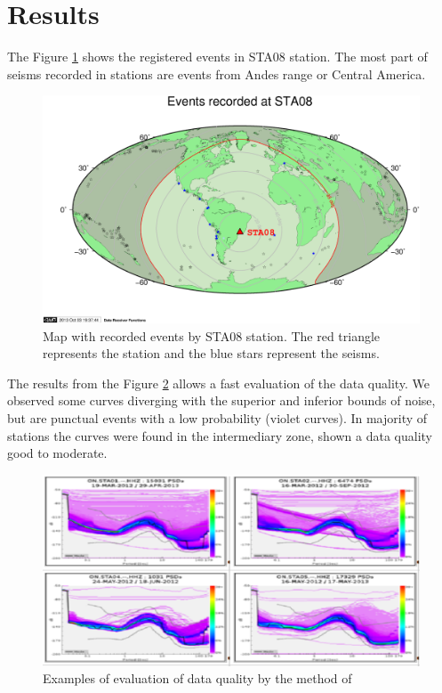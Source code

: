\documentclass[twoside,letterpaper,twocolumn]{article}
\begin{document}
\section{Results}

The Figure \ref{figura3} shows the registered events in STA08 station. The most part of seisms recorded in stations are events from Andes range or Central America.

\begin{figure}[!ht]
\centering
\includegraphics[scale=0.48]{mapa_de_eventos.png} \caption{Map with recorded events by STA08 station. The red triangle represents the station and the blue stars represent the seisms.} 
\label{figura3}
\end{figure}
 
The results from the Figure \ref{figura4} allows a fast evaluation of the data quality. We observed some curves diverging with the superior and inferior bounds of noise, but are punctual events with a low probability (violet curves). In majority of stations the curves were found in the intermediary zone, shown a data quality good to moderate.

\begin{figure}[!ht]
\centering
\includegraphics[scale=0.12]{exemplos_pdf.png} \caption{Examples of evaluation of data quality by the method of \cite{mcnamara_ambient_2004}} 
\label{figura4}
\end{figure}
\end{document}
